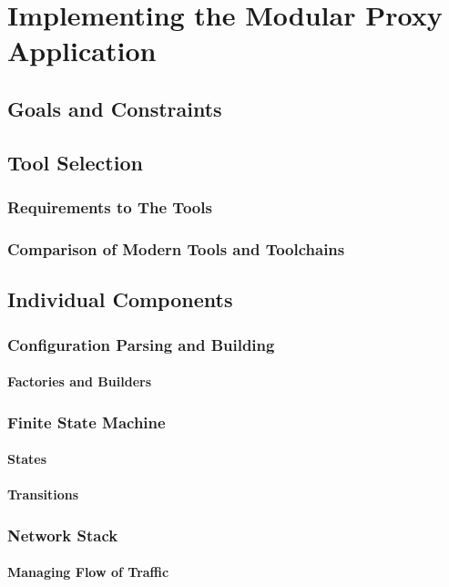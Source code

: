 \chapter{Implementing the Modular Proxy Application}
\section{Goals and Constraints}
\section{Tool Selection}
\subsection{Requirements to The Tools}
\subsection{Comparison of Modern Tools and Toolchains}
\section{Individual Components}
\subsection{Configuration Parsing and Building}
\subsubsection{Factories and Builders}
\subsection{Finite State Machine}
\subsubsection{States}
\subsubsection{Transitions}
\subsection{Network Stack}
\subsubsection{Managing Flow of Traffic}

